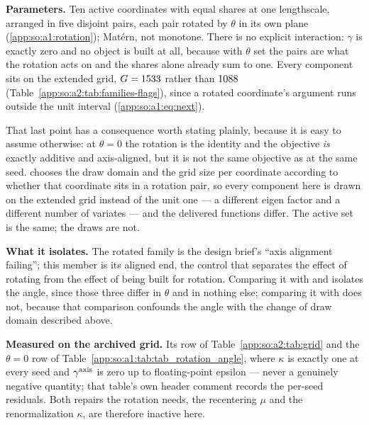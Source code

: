 \label{app:so:a2:rotated-t0}

\textbf{Parameters.} Ten active coordinates with equal shares at one
lengthscale, arranged in five disjoint pairs, each pair rotated by $\theta$ in
its own plane (\ref{app:so:a1:rotation}); Mat\'ern, not monotone. There is no
explicit interaction: $\gamma$ is exactly zero and no 
object is built at all, because with $\theta$ set the pairs are what the
rotation acts on and the shares alone already sum to one. Every component sits
on the extended grid, $G=1533$ rather than $1088$
(Table~\ref{app:so:a2:tab:families-flags}), since a rotated coordinate's argument
runs outside the unit interval (\eqref{app:so:a1:eq:next}).

That last point has a consequence worth stating plainly, because it is easy to
assume otherwise: at $\theta=0$ the rotation is the identity and the objective
\emph{is} exactly additive and axis-aligned, but it is not the same objective
as  at the same seed.  chooses the draw domain
and the grid size per coordinate according to whether that coordinate sits in a
rotation pair, so every component here is drawn on the extended grid instead of
the unit one --- a different eigen factor and a different number of variates ---
and the delivered functions differ. The active set is the same; the draws are
not.

\textbf{What it isolates.} The rotated family is the design brief's ``axis
alignment failing''; this member is its aligned end, the control that separates
the effect of rotating from the effect of being built for rotation. Comparing it
with  and  isolates the angle, since
those three differ in $\theta$ and in nothing else; comparing it with
 does not, because that comparison confounds the angle with
the change of draw domain described above.

\textbf{Measured on the archived grid.} Its row of
Table~\ref{app:so:a2:tab:grid} and the $\theta=0$ row of
Table~\ref{app:so:a1:tab:tab_rotation_angle}, where $\kappa$ is exactly one at
every seed and $\gamma^{\mathrm{axis}}$ is zero up to floating-point epsilon --- never a
genuinely negative quantity; that table's own header comment records the
per-seed residuals. Both repairs the rotation needs, the recentering $\mu$ and
the renormalization $\kappa$, are therefore inactive here.

\label{app:so:a2:rotated-t15}

